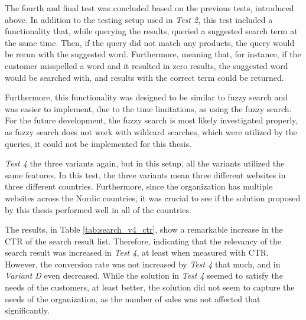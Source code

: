 
The fourth and final test was concluded based on the previous tests, introduced above.
In addition to the testing setup used in \emph{Test 2}, this test included a functionality that, while 
querying the results, queried a suggested search term at the same time.
Then, if the query did not match any products, the query would be rerun with the suggested word.
Furthermore, meaning that, for instance, if the customer misspelled a word and it resulted in zero results,
the suggested word would be searched with, and results with the correct term could be returned.


Furthermore, this functionality was designed to be similar to fuzzy search and was easier to implement,
due to the time limitations, as using the fuzzy search.
For the future development, the fuzzy search is most likely investigated properly, as fuzzy search does not 
work with wildcard searches, which were utilized by the queries, it could not be implemented for this thesis.

\emph{Test 4} the three variants again, but in this setup, all the variants utilized the same features.
In this test, the three variants mean three different websites in three different countries.
Furthermore, since the organization has multiple websites across the Nordic countries, it was crucial
to see if the solution proposed by this thesis performed well in all of the countries.


The results, in Table \ref{tab:search_v4_ctr}, show a remarkable increase in the CTR of the search result list.
Therefore, indicating that the relevancy of the search result was increased in \emph{Test 4}, at least when
measured with CTR.
However, the conversion rate was not increased by \emph{Test 4} that much, and in \emph{Variant D} even decreased.
While the solution in \emph{Test 4} seemed to satisfy the needs of the customers, at least better, the solution did
not seem to capture the needs of the organization, as the number of sales was not affected that significantly.

